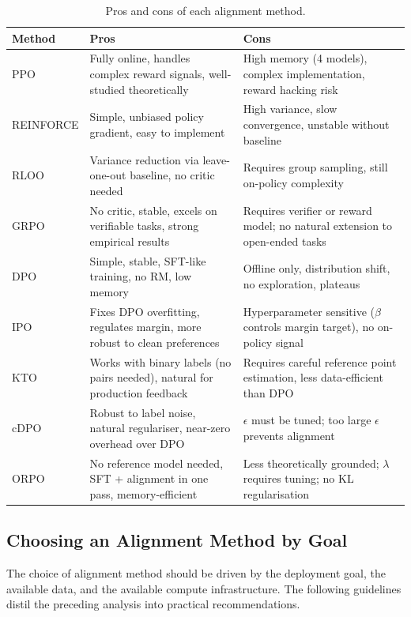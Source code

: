 \begin{table}[ht]
\centering
\caption{Pros and cons of each alignment method.}
\label{tab:alignment-pros-cons}
\footnotesize
\begin{tabular}{@{}lp{3.5cm}p{3.5cm}@{}}
\toprule
\textbf{Method} & \textbf{Pros} & \textbf{Cons} \\
\midrule
PPO
  & Fully online, handles complex reward signals, well-studied theoretically
  & High memory (4 models), complex implementation, reward hacking risk \\
\midrule
REINFORCE
  & Simple, unbiased policy gradient, easy to implement
  & High variance, slow convergence, unstable without baseline \\
\midrule
RLOO
  & Variance reduction via leave-one-out baseline, no critic needed
  & Requires group sampling, still on-policy complexity \\
\midrule
GRPO
  & No critic, stable, excels on verifiable tasks, strong empirical results
  & Requires verifier or reward model; no natural extension to open-ended tasks \\
\midrule
DPO
  & Simple, stable, SFT-like training, no RM, low memory
  & Offline only, distribution shift, no exploration, plateaus \\
\midrule
IPO
  & Fixes DPO overfitting, regulates margin, more robust to clean preferences
  & Hyperparameter sensitive ($\beta$ controls margin target), no on-policy signal \\
\midrule
KTO
  & Works with binary labels (no pairs needed), natural for production feedback
  & Requires careful reference point estimation, less data-efficient than DPO \\
\midrule
cDPO
  & Robust to label noise, natural regulariser, near-zero overhead over DPO
  & $\epsilon$ must be tuned; too large $\epsilon$ prevents alignment \\
\midrule
ORPO
  & No reference model needed, SFT + alignment in one pass, memory-efficient
  & Less theoretically grounded; $\lambda$ requires tuning; no KL regularisation \\
\bottomrule
\end{tabular}
\end{table}

\subsection{Choosing an Alignment Method by Goal}

The choice of alignment method should be driven by the deployment goal, the available data, and the available compute infrastructure. The following guidelines distil the preceding analysis into practical recommendations.

